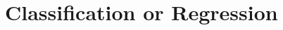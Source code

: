 \documentclass[../../main.tex]{subfiles}
\begin{document}

\section{Classification or Regression}


\end{document}
